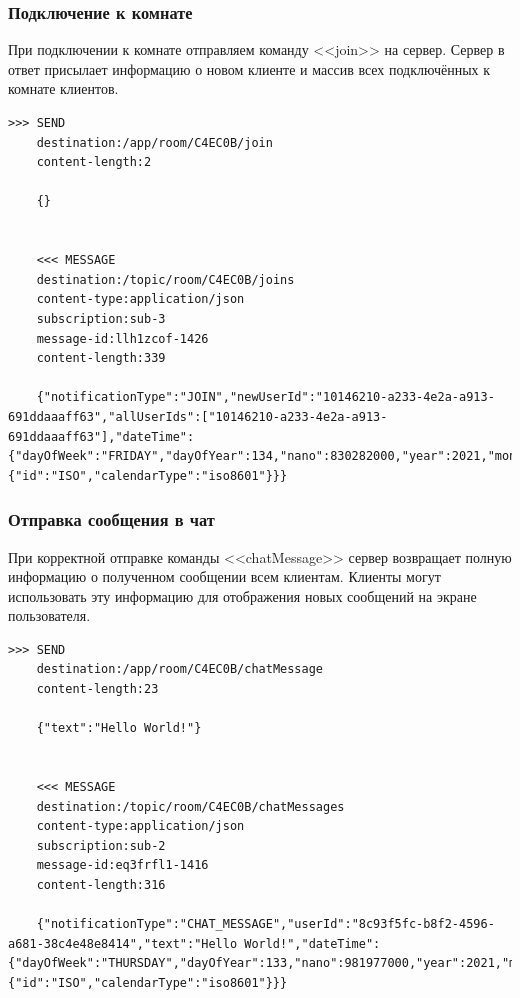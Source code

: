 \documentclass{../../includes/TechDocMultiAuthors}
\begin{document}
    \subsubsection{Подключение к комнате}

    При подключении к комнате отправляем команду <<join>> на сервер.
    Сервер в ответ присылает информацию о новом клиенте и массив всех подключённых к комнате клиентов.

    \begin{lstlisting}[language=text,caption={Запрос и ответ при входе в комнату}]
    >>> SEND
    destination:/app/room/C4EC0B/join
    content-length:2

    {}


    <<< MESSAGE
    destination:/topic/room/C4EC0B/joins
    content-type:application/json
    subscription:sub-3
    message-id:llh1zcof-1426
    content-length:339

    {"notificationType":"JOIN","newUserId":"10146210-a233-4e2a-a913-691ddaaaff63","allUserIds":["10146210-a233-4e2a-a913-691ddaaaff63"],"dateTime":{"dayOfWeek":"FRIDAY","dayOfYear":134,"nano":830282000,"year":2021,"monthValue":5,"dayOfMonth":14,"hour":0,"minute":3,"second":58,"month":"MAY","chronology":{"id":"ISO","calendarType":"iso8601"}}}
    \end{lstlisting}

    \subsubsection{Отправка сообщения в чат}

    При корректной отправке команды <<chatMessage>> сервер возвращает полную информацию о полученном сообщении всем клиентам.
    Клиенты могут использовать эту информацию для отображения новых сообщений на экране пользователя.

    \begin{lstlisting}[language=text,caption={Запрос и ответ при отправке сообщения в чат}]
    >>> SEND
    destination:/app/room/C4EC0B/chatMessage
    content-length:23

    {"text":"Hello World!"}


    <<< MESSAGE
    destination:/topic/room/C4EC0B/chatMessages
    content-type:application/json
    subscription:sub-2
    message-id:eq3frfl1-1416
    content-length:316

    {"notificationType":"CHAT_MESSAGE","userId":"8c93f5fc-b8f2-4596-a681-38c4e48e8414","text":"Hello World!","dateTime":{"dayOfWeek":"THURSDAY","dayOfYear":133,"nano":981977000,"year":2021,"monthValue":5,"dayOfMonth":13,"hour":22,"minute":46,"second":55,"month":"MAY","chronology":{"id":"ISO","calendarType":"iso8601"}}}
    \end{lstlisting}
\end{document}

